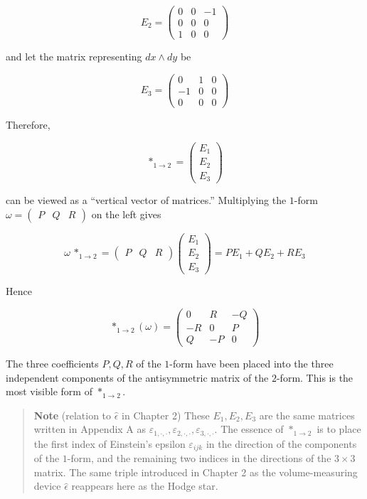 \[
E_2 =
\begin{pmatrix}
0 & 0 & -1 \\
0 & 0 & 0 \\
1 & 0 & 0
\end{pmatrix}
\]

and let the matrix representing \(dx\wedge dy\) be

\[
E_3 =
\begin{pmatrix}
0 & 1 & 0 \\
-1 & 0 & 0 \\
0 & 0 & 0
\end{pmatrix}
\]

Therefore,

\[
\ast_{1\to2}
=
\begin{pmatrix}
E_1\\
E_2\\
E_3
\end{pmatrix}
\]

can be viewed as a ``vertical vector of matrices.'' Multiplying the
\(1\)-form \(\omega=\begin{pmatrix}P&Q&R\end{pmatrix}\) on the left
gives

\[
\omega\,\ast_{1\to2}
=
\begin{pmatrix}P&Q&R\end{pmatrix}
\begin{pmatrix}
E_1\\
E_2\\
E_3
\end{pmatrix}
=
P E_1+Q E_2+R E_3
\]

Hence

\[
\ast_{1\to2}(\omega)
=
\begin{pmatrix}
0 & R & -Q \\
-R & 0 & P \\
Q & -P & 0
\end{pmatrix}
\]

The three coefficients \(P,Q,R\) of the \(1\)-form have been placed into
the three independent components of the antisymmetric matrix of the
\(2\)-form. This is the most visible form of \(\ast_{1\to2}\).

\begin{quote}
\textbf{Note} (relation to \(\widehat{\epsilon}\) in Chapter 2) These
\(E_1,E_2,E_3\) are the same matrices written in Appendix A as
\(\varepsilon_{1,\cdot,\cdot},\varepsilon_{2,\cdot,\cdot},\varepsilon_{3,\cdot,\cdot}\).
The essence of \(\ast_{1\to2}\) is to place the first index of
Einstein's epsilon \(\varepsilon_{ijk}\) in the direction of the
components of the \(1\)-form, and the remaining two indices in the
directions of the \(3\times3\) matrix. The same triple introduced in
Chapter 2 as the volume-measuring device \(\widehat{\epsilon}\)
reappears here as the Hodge star.
\end{quote}


